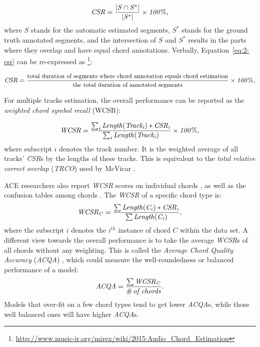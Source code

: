 \begin{equation}
\mathit{CSR = {|S\cap S^*|\over|S^*|} \times 100\%,}
\label{eq:2-csr}
\end{equation}
where $S$ stands for the automatic estimated segments, $S^*$ stands for the ground truth annotated segments, and the intersection of $S$ and $S^*$ results in the parts where they overlap and have equal chord annotations. Verbally, Equation~\ref{eq:2-csr} can be re-expressed as \footnote{\url{http://www.music-ir.org/mirex/wiki/2015:Audio\_Chord\_Estimation}}:

\begin{equation}\footnotesize
\mathit{CSR = {\text{total duration of segments where chord annotation equals chord estimation}\over\text{the total duration of annotated segments}} \times 100\%,}
\label{eq:2-csrv}
\end{equation}

For multiple tracks estimation, the overall performance can be reported as the {\it weighted chord symbol recall} (WCSR):

\begin{equation}
\mathit{WCSR = {\sum_i{Length(Track_i)*CSR_i} \over \sum_i{Length(Track_i)}}\times 100\%,}
\label{eq:2-wcsr}
\end{equation}
where subscript $i$ denotes the track number. It is the weighted average of all tracks' \textit{CSR}s by the lengths of these tracks. This is equivalent to the {\it total relative correct overlap} (\textit{TRCO}) used by McVicar \cite{mcvicar2013machine}.

ACE researchers also report \textit{WCSR} scores on individual chords \cite{mauch2010automatic,deng2016chord}, as well as the confusion tables among chords \cite{mauch2010automatic,oudre2010template,papadopoulos2010joint,khadkevich2011music,deng2016hybrid}. The \textit{WCSR} of a specific chord type is:
\begin{equation}
\mathit{WCSR_{C} = {\sum{Length(C_i)*CSR_i} \over \sum{Length(C_i)}}},
\label{eq:wcsrchord}
\end{equation}
where the subscript $i$ denotes the $i^{th}$ instance of chord $C$ within the data set. A different view towards the overall performance is to take the average \textit{WCSR}s of all chords without any weighting. This is called the \textit{Average Chord Quality Accuracy} (\textit{ACQA}) \cite{cho2014improved}, which could measure the well-roundedness or balanced performance of a model:
\begin{equation}
\mathit{ACQA = {{\sum{WCSR_{C}}} \over {\#\,of\,chords}}}.
\label{eq:2-acqa}
\end{equation}
Models that over-fit on a few chord types tend to get lower \textit{ACQA}s, while those well balanced ones will have higher \textit{ACQA}s.

